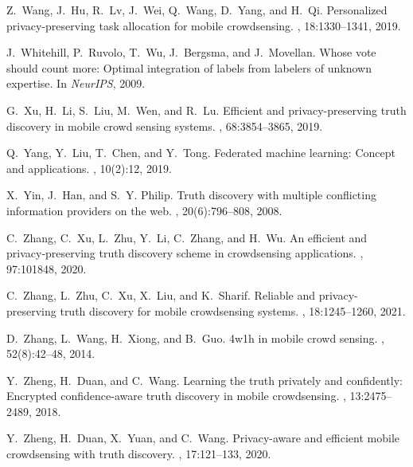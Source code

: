 \documentclass[11pt]{article}
\begin{document}
\begin{thebibliography}{10}
Z.~Wang, J.~Hu, R.~Lv, J.~Wei, Q.~Wang, D.~Yang, and H.~Qi.
\newblock Personalized privacy-preserving task allocation for mobile
  crowdsensing.
, 18:1330--1341, 2019.

J.~Whitehill, P.~Ruvolo, T.~Wu, J.~Bergsma, and J.~Movellan.
\newblock Whose vote should count more: Optimal integration of labels from
  labelers of unknown expertise.
\newblock In {\em NeurIPS}, 2009.

G.~Xu, H.~Li, S.~Liu, M.~Wen, and R.~Lu.
\newblock Efficient and privacy-preserving truth discovery in mobile crowd
  sensing systems.
, 68:3854--3865, 2019.

Q.~Yang, Y.~Liu, T.~Chen, and Y.~Tong.
\newblock Federated machine learning: Concept and applications.
,
  10(2):12, 2019.

X.~Yin, J.~Han, and S.~Y. Philip.
\newblock Truth discovery with multiple conflicting information providers on
  the web.
,
  20(6):796--808, 2008.

C.~Zhang, C.~Xu, L.~Zhu, Y.~Li, C.~Zhang, and H.~Wu.
\newblock An efficient and privacy-preserving truth discovery scheme in
  crowdsensing applications.
, 97:101848, 2020.

C.~Zhang, L.~Zhu, C.~Xu, X.~Liu, and K.~Sharif.
\newblock Reliable and privacy-preserving truth discovery for mobile
  crowdsensing systems.
,
  18:1245--1260, 2021.

D.~Zhang, L.~Wang, H.~Xiong, and B.~Guo.
\newblock 4w1h in mobile crowd sensing.
, 52(8):42--48, 2014.

Y.~Zheng, H.~Duan, and C.~Wang.
\newblock Learning the truth privately and confidently: Encrypted
  confidence-aware truth discovery in mobile crowdsensing.
,
  13:2475--2489, 2018.

Y.~Zheng, H.~Duan, X.~Yuan, and C.~Wang.
\newblock Privacy-aware and efficient mobile crowdsensing with truth discovery.
,
  17:121--133, 2020.

\end{thebibliography}
\end{document}
